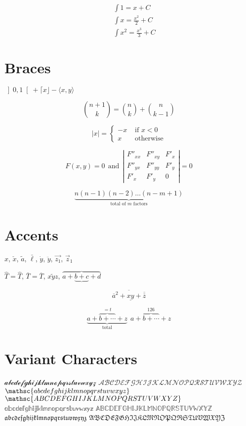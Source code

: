 \documentclass{article}
\begin{document}
\begin{eqnarray}
&& \int 1 = x + C \nonumber\\
&& \int x = \frac{x^2}{2} + C \nonumber\\
&& \int x^2 = \frac{x^3}{3} + C \label{eq:xdef}
\end{eqnarray}

\section{Braces}

$\left] 0,1
\right[
 + \lceil x \rfloor - \langle x,y\rangle$
 
$$
{n+1\choose k} = {n\choose k} + {n \choose k-1}
$$

$$
|x| = \left\{ \begin{array}{rl}
 -x &\mbox{ if $x<0$} \\
  x &\mbox{ otherwise}
       \end{array} \right.
$$

$$
F(x,y)=0 ~~\mbox{and}~~
\left| \begin{array}{ccc}
  F''_{xx} & F''_{xy} &  F'_x \\
  F''_{yx} & F''_{yy} &  F'_y \\
  F'_x     & F'_y     & 0 
  \end{array}\right| = 0
$$

$$
\underbrace{n(n-1)(n-2)\dots(n-m+1)}_{\mbox{total of $m$ factors}}
$$

\section{Accents}

$\hat{x}$, $\check{x}$, $\tilde{a}$, 
$\bar{\ell}$, $\dot{y}$, $\ddot{y}$, 
$\vec{z_1}$, $\vec{z}_1$

$\hat{T} = \widehat{T}$,
$\bar{T} = \overline{T}$, $\widetilde{xyz}$,
$\overbrace{a+\underbrace{b+c}+d}$

$$
 \overline{\overline{a}^2+\underline{xy}
 +\overline{\overline{z}}}
$$

$$
\underbrace{a+\overbrace{b+\cdots}^{{}=t}+z}
_{\mathrm{total}} ~~
a+{\overbrace{b+\cdots}}^{126}+z
$$

\section{Variant Characters}
$ \mathcal{abcdefghijklmnopqrstuvwxyz} $
$ \mathcal{ABCDEFGHIJKLMNOPQRSTUVWXYZ} $
$ \mathsc{abcdefghijklmnopqrstuvwxyz} $
$ \mathsc{ABCDEFGHIJKLMNOPQRSTUVWXYZ} $
$ \mathbb{abcdefghijklmnopqrstuvwxyz} $
$ \mathbb{ABCDEFGHIJKLMNOPQRSTUVWXYZ} $
$ \mathfrak{abcdefghijklmnopqrstuvwxyz} $
$ \mathfrak{ABCDEFGHIJKLMNOPQRSTUVWXYZ} $
\end{document}
